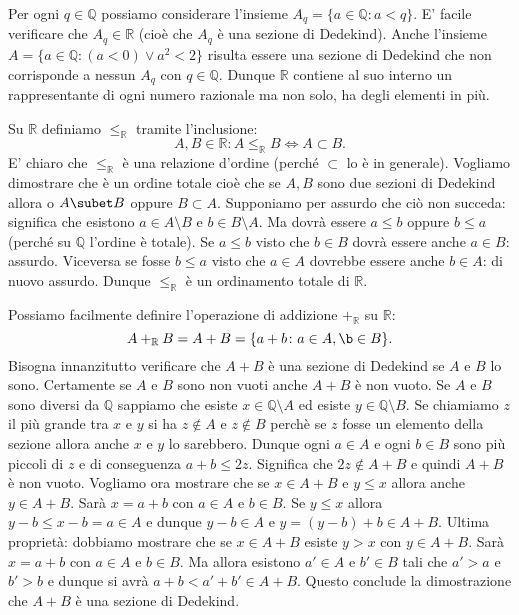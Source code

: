 \documentclass[italian,a4paper,hidelinks,headinclude]{scrartcl}
\newcommand{\QQ}{{\mathbb Q}}
\newcommand{\RR}{{\mathbb R}}
\begin{document}
Per ogni $q\in \QQ$ possiamo considerare l'insieme $A_q = \{a\in \QQ\colon a<q\}$.
E' facile verificare che $A_q\in \RR$ (cioè che $A_q$ è una sezione di Dedekind).
Anche l'insieme $A= \{a\in \QQ \colon (a<0) \lor a^2<2\}$ risulta essere una
sezione di Dedekind che non corrisponde
a nessun $A_q$ con $q\in \QQ$.
Dunque $\RR$ contiene al suo interno un rappresentante di ogni numero razionale
ma non solo, ha degli elementi in più.

Su $\RR$ definiamo $\le_\RR$ tramite l'inclusione:
\[
  A,B\in \RR: A \le_\RR B \iff A \subset B.
\]
E' chiaro che $\le_\RR$ è una relazione d'ordine
(perché $\subset$ lo è in generale).
Vogliamo dimostrare che è un ordine totale cioè che
se $A,B$ sono due sezioni di Dedekind allora o $A\subet B$
oppure $B\subset A$. Supponiamo per assurdo che ciò non succeda:
significa che esistono $a\in A\setminus B$ e $b\in B\setminus A$.
Ma dovrà essere $a\le b$ oppure $b\le a$ (perché su $\QQ$ l'ordine è totale).
Se $a\le b$ visto che $b\in B$ dovrà essere anche $a\in B$: assurdo.
Viceversa se fosse $b\le a$ visto che $a\in A$ dovrebbe essere anche $b\in A$:
di nuovo assurdo. Dunque $\le_\RR$ è un ordinamento totale di $\RR$.

Possiamo facilmente definire l'operazione di addizione $+_\RR$ su $\RR$: \[ A
+_\RR B = A+B = \{a+b\colon a \in A, \b\in B\}. \] Bisogna innanzitutto
verificare che $A+B$ è una sezione di Dedekind se $A$  e $B$ lo sono. Certamente
se $A$ e $B$ sono non vuoti anche $A+B$ è non vuoto. Se $A$ e $B$ sono diversi
da $\QQ$ sappiamo che esiste $x\in \QQ \setminus A$ ed esiste $y \in \QQ
\setminus B$. Se chiamiamo $z$ il più grande tra $x$ e $y$  si ha $z\not \in A$
e $z\not \in B$ perchè se $z$ fosse un elemento della sezione  allora anche $x$
e $y$ lo sarebbero. Dunque ogni $a\in A$ e ogni $b\in B$ sono  più piccoli di
$z$ e di conseguenza $a+b \le 2z$. Significa che $2z\not \in A+B$ e quindi $A+B$
è non vuoto. Vogliamo ora mostrare che se $x \in A+B$ e $y\le x$  allora anche
$y\in A+B$. Sarà $x=a+b$ con $a\in A$ e $b\in B$. Se $y\le x$ allora  $y-b \le
x-b = a\in A$ e dunque $y-b \in A$ e $y = (y-b) + b \in A+B$. Ultima proprietà:
dobbiamo mostrare che se $x\in A+B$ esiste $y>x$ con $y\in A+B$. Sarà $x=a+b$
con $a\in A$ e $b\in B$. Ma allora esistono $a'\in A$ e $b'\in B$  tali che
$a'>a$ e $b'>b$ e dunque si avrà $a+b < a'+b' \in A+B$. Questo conclude la
dimostrazione che $A+B$ è una sezione di Dedekind.
\end{document}
